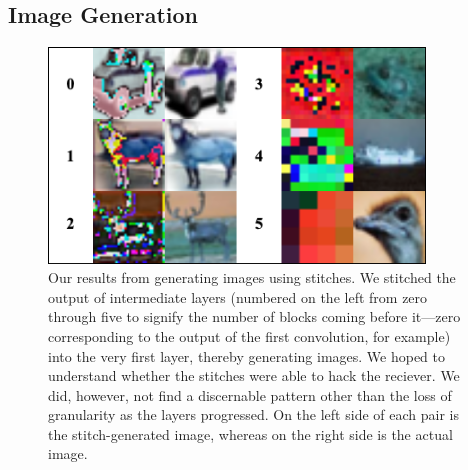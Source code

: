 \documentclass{article}
\begin{document}
\subsection*{Image Generation}
\begin{center}
  \begin{figure}[H]
     \centering
     \includegraphics[width=10cm]{images.png}
     \caption{Our results from generating images using stitches.
     We stitched the output of intermediate
     layers (numbered on the left from zero through five to signify the 
     number of blocks coming before it---zero
     corresponding to the output of the first
     convolution, for example) into the very first layer, thereby
     generating images. We hoped to
     understand whether the stitches
     were able to hack the reciever. We did, however,
     not find a discernable pattern other than the loss
     of granularity as the layers progressed.
     On the left side of each pair is the stitch-generated
     image, whereas on the right side is the actual image.}
  \end{figure}
\end{center}
\end{document}
